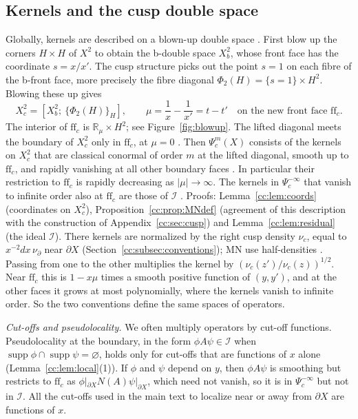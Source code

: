 \documentclass[11pt,oneside,reqno]{article}
\DeclareMathOperator{\supp}{supp}
\newcommand{\R}{\mathbb R}
\newcommand{\cI}{\mathcal I}
\newcommand{\Psic}{\Psi_{c}}
\theoremstyle{plain}
\theoremstyle{definition}
\theoremstyle{remark}
\begin{document}
\subsection{Kernels and the cusp double space}\label{subsec:double}
Globally, kernels are described on a blown-up double space
\cite[App.~A]{MN}. First blow up the corners \(H\times H\) of \(X^2\) to
obtain the b-double space \(X_b^2\), whose front face has the coordinate
\(s=x/x'\). The cusp structure picks out the point \(s=1\) on each fibre
of the b-front face, more precisely the fibre diagonal
\(\Phi_2(H)=\{s=1\}\times H^2\). Blowing these up gives
\[
 X_c^2=[X_b^2;\ \{\Phi_2(H)\}_H],\qquad
 \mu=\frac1x-\frac1{x'}=t-t' \quad\text{on the new front face }\mathrm{ff}_c .
\]
The interior of \(\mathrm{ff}_c\) is \(\R_\mu\times H^2\); see
Figure~\ref{fig:blowup}. The lifted diagonal meets the boundary of
\(X_c^2\) only in \(\mathrm{ff}_c\), at \(\mu=0\) \cite[Lemma~22]{MN}. Then
\(\Psic^m(X)\) consists of the kernels on \(X_c^2\) that are classical
conormal of order \(m\) at the lifted diagonal, smooth up to
\(\mathrm{ff}_c\), and rapidly vanishing at all other boundary faces
\cite[Def.~2]{MN}. In particular their restriction to \(\mathrm{ff}_c\) is
rapidly decreasing as \(|\mu|\to\infty\). The kernels in
\(\Psic^{-\infty}\) that vanish to infinite order also at \(\mathrm{ff}_c\)
are those of \(\cI\) \cite[Def.~1]{MN}. Proofs: Lemma~\ref{cc:lem:coords}
(coordinates on \(X_c^2\)), Proposition~\ref{cc:prop:MNdef} (agreement of
this description with the construction of Appendix~\ref{cc:sec:cusp}) and
Lemma~\ref{cc:lem:residual} (the ideal \(\cI\)). There kernels are
normalized by the right cusp density \(\nu_c\), equal to
\(x^{-2}dx\,\nu_\partial\) near \(\partial X\)
(Section~\ref{cc:subsec:conventions}); MN use half-densities
\cite[(118)]{MN}. Passing from one to the other multiplies the kernel by
\((\nu_c(z')/\nu_c(z))^{1/2}\). Near \(\mathrm{ff}_c\) this is
\(1-x\mu\) times a smooth positive function of \((y,y')\), and at the other
faces it grows at most polynomially, where the kernels vanish to infinite
order. So the two conventions define the same spaces of operators.

\emph{Cut-offs and pseudolocality.} We often multiply operators by
cut-off functions. Pseudolocality at the boundary, in the form
\(\phi A\psi\in\cI\) when \(\supp\phi\cap\supp\psi=\varnothing\), holds
only for cut-offs that are functions of \(x\) alone
(Lemma~\ref{cc:lem:local}(1)). If \(\phi\) and \(\psi\) depend on \(y\),
then \(\phi A\psi\) is smoothing but restricts to \(\mathrm{ff}_c\) as
\(\phi|_{\partial X}N(A)\psi|_{\partial X}\), which need not vanish, so it is
in \(\Psic^{-\infty}\) but not in \(\cI\). All the cut-offs used in the
main text to localize near or away from \(\partial X\) are functions of
\(x\).
\end{document}
